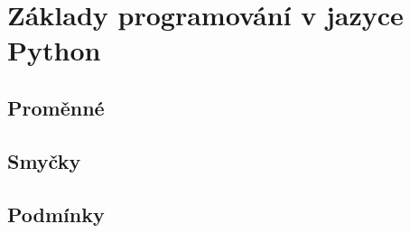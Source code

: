 \documentclass[../main.tex]{subfiles}
\begin{document}
	\section{Základy programování v jazyce Python}

	\subsection{Proměnné}

	\subsection{Smyčky}

	\subsection{Podmínky}
\end{document}
